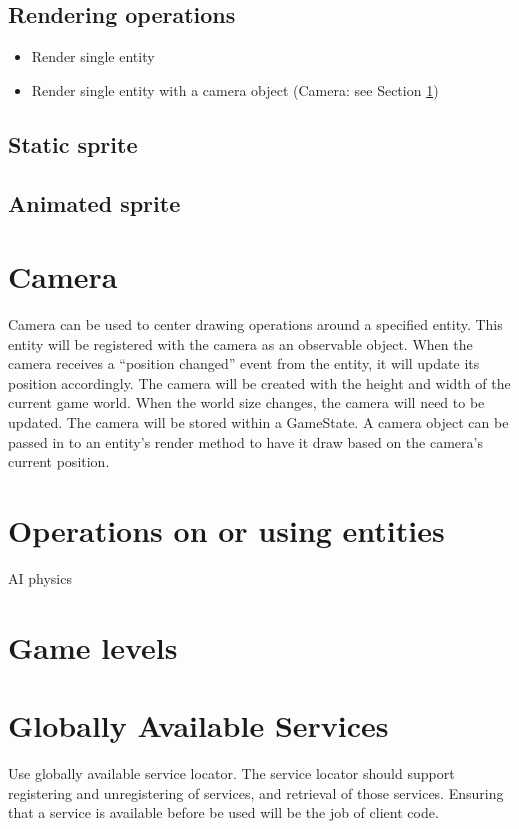 \documentclass[12pt]{article}
\begin{document}
\subsection{Rendering operations }
\begin{itemize}
	\item Render single entity
	\item Render single entity with a camera object (Camera: see Section \ref{sec:Camera})
\end{itemize}
\subsection{Static sprite }
\subsection{Animated sprite }


\section{ Camera} \label{sec:Camera}
Camera can be used to center drawing operations around a specified entity.  This entity will be registered with the camera as an observable object.  When the camera receives a ``position changed'' event from the entity, it will update its position accordingly.  The camera will be created with the height and width of the current game world.  When the world size changes, the camera will need to be updated.  The camera will be stored within a GameState.  A camera object can be passed in to an entity's render method to have it draw based on the camera's current position.

\section{	Operations on or using entities}
		AI
		physics

\section{	Game levels}

\section{ Globally Available Services}
Use globally available service locator.  The service locator should support registering and unregistering of services, and retrieval of those services.  Ensuring that a service is available before be used will be the job of client code.
\end{document}
